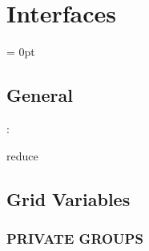 
\section{Interfaces} 


\parskip = 0pt

\vspace{3mm} \subsection*{General}

: 

reduce
\vspace{2mm}
\subsection*{Grid Variables}
\vspace{5mm}\subsubsection{PRIVATE GROUPS}

\vspace{5mm}

